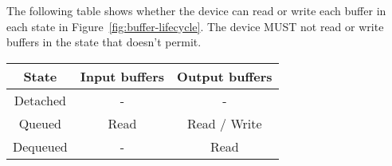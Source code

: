 
The following table shows whether the device can read or write each buffer in
each state in Figure~\ref{fig:buffer-lifecycle}. The device MUST not read or
write buffers in the state that doesn't permit.
\begin{center}
  \begin{tabular}{ |c|c|c| }
    \hline
    State & Input buffers & Output buffers \\
    \hline
    Detached  & -    & - \\
    Queued   & Read & Read / Write \\
    Dequeued & -    & Read \\
    \hline
  \end{tabular}
\end{center}
